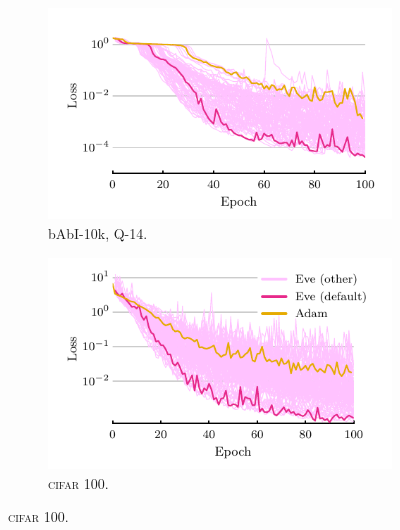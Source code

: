 \documentclass[preview,varwidth=7in,border=0mm]{standalone}
\begin{document}
\begin{figure}
    \centering
    \hfill%
    \begin{subfigure}[t]{0.5\textwidth}
        \centering
        \includegraphics[width=\linewidth]{babi_q14.pdf}
        \caption{bAbI-10k, Q-14.}
    \end{subfigure}%
    \begin{subfigure}[t]{0.5\textwidth}
        \centering
        \includegraphics[width=\linewidth]{resnet.pdf}
        \caption{\textsc{cifar 100.}}
    \end{subfigure}
    \hfill%
\end{figure}
\end{document}
